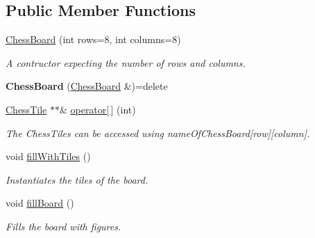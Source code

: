 \subsection*{Public Member Functions}
\begin{DoxyCompactItemize}
\item 
\mbox{\hyperlink{classChessBoard_a1b745365065a0d4c7593589303ef4d76}{Chess\+Board}} (int rows=8, int columns=8)
\begin{DoxyCompactList}\small\item\em A contructor expecting the number of rows and columns. \end{DoxyCompactList}\item 
\mbox{\label{classChessBoard_aa52c65d2811e1b16f645968c7376e490}} 
{\bfseries Chess\+Board} (\mbox{\hyperlink{classChessBoard}{Chess\+Board}} \&)=delete
\item 
\mbox{\label{classChessBoard_a5fef5d9dd63b08d21926fa357633d7a3}} 
\mbox{\hyperlink{classChessTile}{Chess\+Tile}} $\ast$$\ast$\& \mbox{\hyperlink{classChessBoard_a5fef5d9dd63b08d21926fa357633d7a3}{operator\mbox{[}$\,$\mbox{]}}} (int)
\begin{DoxyCompactList}\small\item\em The Chess\+Tiles can be accessed using name\+Of\+Chess\+Board\mbox{[}row\mbox{]}\mbox{[}column\mbox{]}. \end{DoxyCompactList}\item 
\mbox{\label{classChessBoard_a7f2b454b63cad50b551a42995fe20b92}} 
void \mbox{\hyperlink{classChessBoard_a7f2b454b63cad50b551a42995fe20b92}{fill\+With\+Tiles}} ()
\begin{DoxyCompactList}\small\item\em Instantiates the tiles of the board. \end{DoxyCompactList}\item 
\mbox{\label{classChessBoard_a104b758d5c28f2b31e12d34b467c37f5}} 
void \mbox{\hyperlink{classChessBoard_a104b758d5c28f2b31e12d34b467c37f5}{fill\+Board}} ()
\begin{DoxyCompactList}\small\item\em Fills the board with figures. \end{DoxyCompactList}\item 
\mbox{\label{classChessBoard_acc60486a0fafa95c85263e15e6b7f6ab}} 
$$
\end{DoxyCompactItemize}
